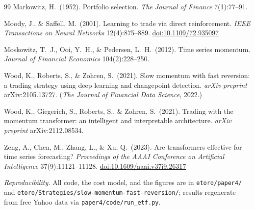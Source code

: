 \documentclass[11pt,a4paper]{article}
\theoremstyle{definition}
\begin{document}
\begin{thebibliography}{99}
 Markowitz, H.\ (1952). Portfolio selection. \emph{The Journal of Finance}
7(1):77--91.

 Moody, J., \& Saffell, M.\ (2001). Learning to trade via direct reinforcement.
\emph{IEEE Transactions on Neural Networks} 12(4):875--889.
\href{https://doi.org/10.1109/72.935097}{doi:10.1109/72.935097}

 Moskowitz, T.\ J., Ooi, Y.\ H., \& Pedersen, L.\ H.\ (2012). Time series
momentum. \emph{Journal of Financial Economics} 104(2):228--250.

 Wood, K., Roberts, S., \& Zohren, S.\ (2021). Slow momentum with fast reversion:
a trading strategy using deep learning and changepoint detection. \emph{arXiv preprint}
arXiv:2105.13727. (\emph{The Journal of Financial Data Science}, 2022.)

 Wood, K., Giegerich, S., Roberts, S., \& Zohren, S.\ (2021). Trading with the
momentum transformer: an intelligent and interpretable architecture. \emph{arXiv preprint}
arXiv:2112.08534.

 Zeng, A., Chen, M., Zhang, L., \& Xu, Q.\ (2023). Are transformers effective for
time series forecasting? \emph{Proceedings of the AAAI Conference on Artificial Intelligence}
37(9):11121--11128. \href{https://doi.org/10.1609/aaai.v37i9.26317}{doi:10.1609/aaai.v37i9.26317}

\end{thebibliography}

\vspace{0.5em}
\noindent\textit{Reproducibility.} All code, the cost model, and the figures are in
\texttt{etoro/paper4/} and \texttt{etoro/Strategies/slow-momentum-fast-reversion/}; results
regenerate from free Yahoo data via \texttt{paper4/code/run\_etf.py}.
\end{document}
